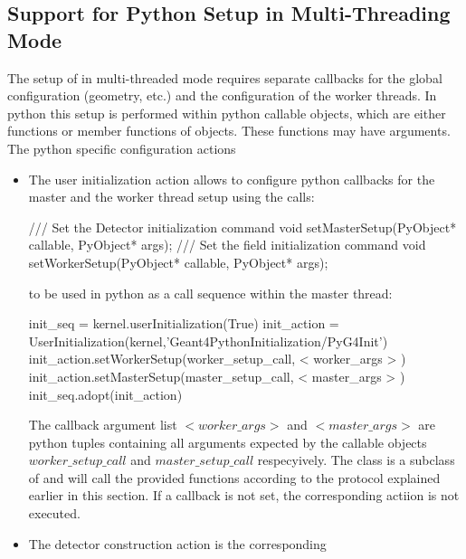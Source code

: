 \subsection{Support for Python Setup in Multi-Threading Mode}
\label{sec:ddg4-multi-threading-python}
\noindent
The setup of \DDG in multi-threaded mode requires separate callbacks for 
the global configuration (geometry, etc.) and the configuration of the worker 
threads. In python this setup is performed within {\rm{python callable}}
objects, which are either functions or member functions of objects.
These functions may have arguments. The python specific configuration actions
\begin{itemize}\itemcompact
\item The user initialization action 
    {} allows to configure python callbacks
    for the master and the worker thread setup using the calls:
    \begin{code}
      /// Set the Detector initialization command
      void setMasterSetup(PyObject* callable, PyObject* args);
      /// Set the field initialization command
      void setWorkerSetup(PyObject* callable, PyObject* args);              \end{code}
     to be used in python as a call sequence within the master thread:
    \begin{code}
     init_seq = kernel.userInitialization(True)
     init_action = UserInitialization(kernel,'Geant4PythonInitialization/PyG4Init')
     init_action.setWorkerSetup(worker_setup_call, < worker_args > )
     init_action.setMasterSetup(master_setup_call, < master_args > )
     init_seq.adopt(init_action)                                            \end{code}
    The callback argument list $< worker\_args >$ and $< master\_args >$
    are python tuples containing all arguments expected by the callable objects
    $worker\_setup\_call$ and $master\_setup\_call$ respecyively.
    The class {} is a subclass of
    {} and will call the provided functions
    according to the protocol explained earlier in this section.
    If a callback is not set, the corresponding actiion is not executed.
\item The detector construction action 
    {} is the corresponding 

\end{itemize}
